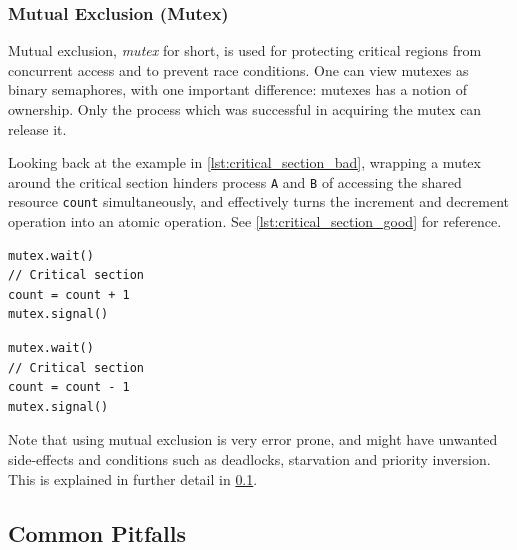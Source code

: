 \subsubsection{Mutual Exclusion (Mutex)}


Mutual exclusion, \textit{mutex} for short, is used for protecting critical regions from concurrent access and to prevent race conditions. One can view mutexes as binary semaphores, with one important difference: mutexes has a notion of ownership. Only the process which was successful in acquiring the mutex can release it. 

Looking back at the example in \cref{lst:critical_section_bad}, wrapping a mutex around the critical section hinders process \texttt{A} and \texttt{B} of accessing the shared resource \texttt{count} simultaneously, and effectively turns the increment and decrement operation into an atomic operation. See \cref{lst:critical_section_good} for reference.

\begin{lstfloat}
\noindent\begin{minipage}{0.45\textwidth}
\begin{lstlisting}[title={Process A},style={CustomC},frame={},xleftmargin={4em}]
mutex.wait()
// Critical section
count = count + 1
mutex.signal()
\end{lstlisting}
\end{minipage}
\begin{minipage}{0.45\textwidth}
\begin{lstlisting}[title={Process B},style={CustomC},frame={},xleftmargin={4em}]
mutex.wait()
// Critical section
count = count - 1
mutex.signal()
\end{lstlisting}
\end{minipage}
\label{lst:critical_section_good}
\end{lstfloat}

Note that using mutual exclusion is very error prone, and might have unwanted side\hyp{}effects and conditions such as deadlocks, starvation and priority inversion. This is explained in further detail in \cref{subsec:common_pitfals}.


\subsection{Common Pitfalls}
\label{subsec:common_pitfals}


